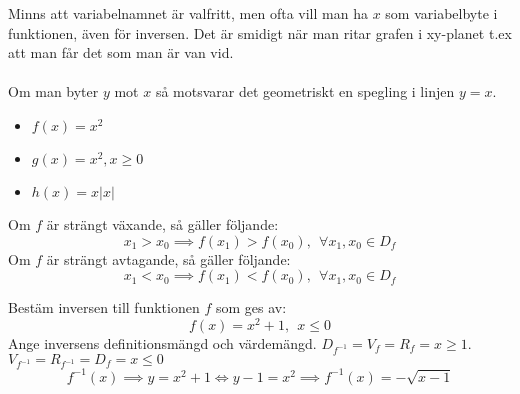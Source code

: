 \documentclass{report}
\begin{document}


\vspace{20pt}
\noindent
Minns att variabelnamnet är valfritt, men ofta vill man ha $ x $ som variabelbyte i funktionen, även för inversen. Det är smidigt när man ritar grafen i xy-planet t.ex att man får det som man är van vid.\\\\

\noindent
Om man byter $ y $ mot $ x $ så motsvarar det geometriskt en spegling i linjen $ y=x $.

\ex{}
{
\begin{itemize}
	\item $ f(x) = x^2 $
	\item $ g(x) = x^2, x \ge 0 $
	\item $ h(x) = x |x| $ 
\end{itemize}
}

{
	Om $ f $ är strängt växande, så gäller följande:
	\begin{equation*}
	x_1 > x_0 \implies f(x_1) > f(x_0),\:\: \forall x_1,x_0 \in D_f
	\end{equation*}
	Om $ f $ är strängt avtagande, så gäller följande:
	\begin{equation*}
	x_1 < x_0 \implies f(x_1) < f(x_0),\:\: \forall x_1,x_0 \in D_f
	\end{equation*}
}

\vspace{20pt}
\qs{}
{
Bestäm inversen till funktionen $ f $ som ges av:
\begin{equation*}
f(x) = x^2 + 1,\:\: x \le 0
\end{equation*}
Ange inversens definitionsmängd och värdemängd.
}
\sol $ D_{f^{-1}} = V_f = R_f = x \ge 1 $. $ V_{f^{-1}} = R_{f^{-1}} = D_f = x \le 0 $
\begin{equation*}
	f^{-1}(x) \implies y = x^2+1 \iff y-1 = x^2 \implies f^{-1}(x) = -\sqrt{x-1}   
\end{equation*}
\end{document}
